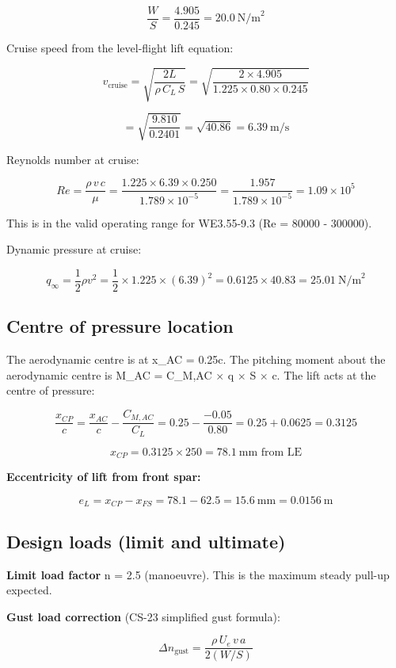 \documentclass[10pt,a4paper]{article}
\begin{document}
\[
\frac{W}{S} = \frac{4.905}{0.245} = 20.0\ \text{N/m}^2
\]

Cruise speed from the level-flight lift equation:

\[
v_{\text{cruise}} = \sqrt{\frac{2L}{\rho\, C_L\, S}} = \sqrt{\frac{2 \times 4.905}{1.225 \times 0.80 \times 0.245}}
\]

\[
= \sqrt{\frac{9.810}{0.2401}} = \sqrt{40.86} = 6.39\ \text{m/s}
\]

Reynolds number at cruise:

\[
Re = \frac{\rho\, v\, c}{\mu} = \frac{1.225 \times 6.39 \times 0.250}{1.789 \times 10^{-5}} = \frac{1.957}{1.789 \times 10^{-5}} = 1.09 \times 10^5
\]

This is in the valid operating range for WE3.55-9.3 (Re = 80000 - 300000).

Dynamic pressure at cruise:

\[
q_{\infty} = \frac{1}{2}\rho v^2 = \frac{1}{2} \times 1.225 \times (6.39)^2 = 0.6125 \times 40.83 = 25.01\ \text{N/m}^2
\]


\subsection{Centre of pressure location}


The aerodynamic centre is at x\_AC = 0.25c. The pitching moment about the aerodynamic centre is M\_AC = C\_M,AC ${\times}$ q ${\times}$ S ${\times}$ c. The lift acts at the centre of pressure:

\[
\frac{x_{CP}}{c} = \frac{x_{AC}}{c} - \frac{C_{M,AC}}{C_L} = 0.25 - \frac{-0.05}{0.80} = 0.25 + 0.0625 = 0.3125
\]

\[
x_{CP} = 0.3125 \times 250 = 78.1\ \text{mm from LE}
\]

\textbf{Eccentricity of lift from front spar:}

\[
e_L = x_{CP} - x_{FS} = 78.1 - 62.5 = 15.6\ \text{mm} = 0.0156\ \text{m}
\]


\subsection{Design loads (limit and ultimate)}


\textbf{Limit load factor} n = 2.5 (manoeuvre). This is the maximum steady pull-up expected.

\textbf{Gust load correction} (CS-23 simplified gust formula):

\[
\Delta n_{\text{gust}} = \frac{\rho\, U_e\, v\, a}{2 (W/S)}
\]
\end{document}
